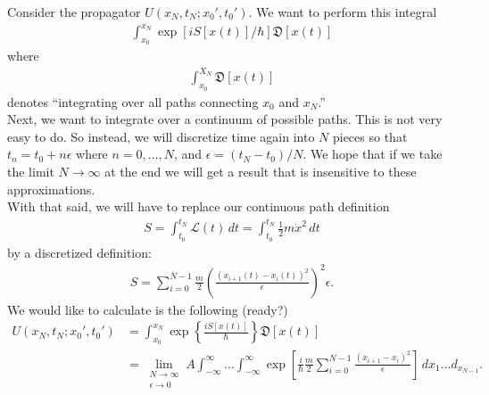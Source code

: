 \documentclass{book}
\theoremstyle{definition}
\newcommand{\lag}{\mathcal{L}}
\newcommand{\f}[2]{\frac{#1}{#2}}
\newcommand{\lp}{\left(}
\newcommand{\rp}{\right)}
\newcommand{\lb}{\left[}
\newcommand{\rb}{\right]}
\newcommand{\lc}{\left\{}
\newcommand{\rc}{\right\}}
\begin{document}
Consider the propagator $U(x_N, t_N; x_0', t_0')$. We want to perform this integral
\begin{align}
\int_{x_0}^{x_N} \exp[iS[x(t)]/\hbar]\mathfrak{D}[x(t)]
\end{align} 
where
\begin{align}
\int_{x_0}^{X_N}\mathfrak{D}[x(t)]
\end{align}
denotes ``integrating over all paths connecting $x_0$ and $x_N$.'' \\

Next, we want to integrate over a continuum of possible paths. This is not very easy to do. So instead, we will discretize time again into $N$ pieces so that $t_n = t_0 + n\epsilon$ where $n = 0,\dots,N$, and $\epsilon = (t_N - t_0)/N$. We hope that if we take the limit $N \to \infty$ at the end we will get a result that is insensitive to these approximations.\\

With that said, we will have to replace our continuous path definition
\begin{align}
S = \int_{t_0}^{t_N} \lag(t)\,dt = \int_{t_0}^{t_N} \f{1}{2}m\dot{x}^2\,dt
\end{align}
by a discretized definition:
\begin{align}
S = \sum^{N-1}_{i=0} \f{m}{2}\lp  \f{(x_{i+1}(t) - x_i(t))^2}{\epsilon}\rp^2 \epsilon.
\end{align}
We would like to calculate is the following (ready?)
\begin{align}
U(x_N,t_N;x_0',t_0') &= \int_{x_0}^{x_N} \exp\lc \f{iS[x(t)]}{\hbar} \rc\mathfrak{D}[x(t)] \\ 
&= \lim_{\substack{N\to\infty \\ \epsilon\to 0}} A \int_{-\infty}^{\infty} \dots \int_{-\infty}^{\infty} \exp\lb \f{i}{\hbar}\f{m}{2}\sum_{i=0}^{N-1} \f{(x_{i+1} - x_i)^2}{\epsilon} \rb\, dx_1\dots d_{x_{N-1}}.
\end{align}
\end{document}
